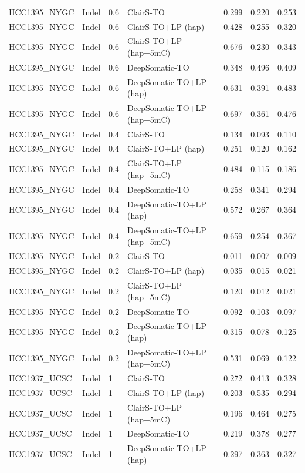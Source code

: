 \documentclass[pdflatex,sn-nature]{sn-jnl}
\begin{document}
{\begin{longtable}{@{}llllccc@{}}
  HCC1395\_NYGC & Indel & 0.6 & ClairS-TO & 0.299 & 0.220 & 0.253 \\
  HCC1395\_NYGC & Indel & 0.6 & ClairS-TO+LP (hap) & 0.428 & 0.255 & 0.320 \\
  HCC1395\_NYGC & Indel & 0.6 & ClairS-TO+LP (hap+5mC) & 0.676 & 0.230 & 0.343 \\
  HCC1395\_NYGC & Indel & 0.6 & DeepSomatic-TO & 0.348 & 0.496 & 0.409 \\
  HCC1395\_NYGC & Indel & 0.6 & DeepSomatic-TO+LP (hap) & 0.631 & 0.391 & 0.483 \\
  HCC1395\_NYGC & Indel & 0.6 & DeepSomatic-TO+LP (hap+5mC) & 0.697 & 0.361 & 0.476 \\
  HCC1395\_NYGC & Indel & 0.4 & ClairS-TO & 0.134 & 0.093 & 0.110 \\
  HCC1395\_NYGC & Indel & 0.4 & ClairS-TO+LP (hap) & 0.251 & 0.120 & 0.162 \\
  HCC1395\_NYGC & Indel & 0.4 & ClairS-TO+LP (hap+5mC) & 0.484 & 0.115 & 0.186 \\
  HCC1395\_NYGC & Indel & 0.4 & DeepSomatic-TO & 0.258 & 0.341 & 0.294 \\
  HCC1395\_NYGC & Indel & 0.4 & DeepSomatic-TO+LP (hap) & 0.572 & 0.267 & 0.364 \\
  HCC1395\_NYGC & Indel & 0.4 & DeepSomatic-TO+LP (hap+5mC) & 0.659 & 0.254 & 0.367 \\
  HCC1395\_NYGC & Indel & 0.2 & ClairS-TO & 0.011 & 0.007 & 0.009 \\
  HCC1395\_NYGC & Indel & 0.2 & ClairS-TO+LP (hap) & 0.035 & 0.015 & 0.021 \\
  HCC1395\_NYGC & Indel & 0.2 & ClairS-TO+LP (hap+5mC) & 0.120 & 0.012 & 0.021 \\
  HCC1395\_NYGC & Indel & 0.2 & DeepSomatic-TO & 0.092 & 0.103 & 0.097 \\
  HCC1395\_NYGC & Indel & 0.2 & DeepSomatic-TO+LP (hap) & 0.315 & 0.078 & 0.125 \\
  HCC1395\_NYGC & Indel & 0.2 & DeepSomatic-TO+LP (hap+5mC) & 0.531 & 0.069 & 0.122 \\
  HCC1937\_UCSC & Indel & 1 & ClairS-TO & 0.272 & 0.413 & 0.328 \\
  HCC1937\_UCSC & Indel & 1 & ClairS-TO+LP (hap) & 0.203 & 0.535 & 0.294 \\
  HCC1937\_UCSC & Indel & 1 & ClairS-TO+LP (hap+5mC) & 0.196 & 0.464 & 0.275 \\
  HCC1937\_UCSC & Indel & 1 & DeepSomatic-TO & 0.219 & 0.378 & 0.277 \\
  HCC1937\_UCSC & Indel & 1 & DeepSomatic-TO+LP (hap) & 0.297 & 0.363 & 0.327 \\

\end{longtable}}
\end{document}
